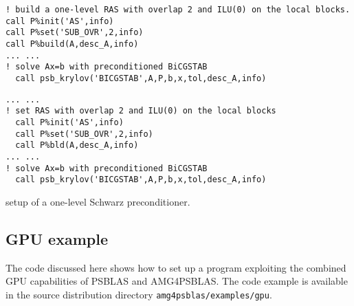 \begin{listing}[h!]
\ifpdf
\begin{verbatim}
! build a one-level RAS with overlap 2 and ILU(0) on the local blocks.
call P%init('AS',info)
call P%set('SUB_OVR',2,info)
call P%build(A,desc_A,info)
... ...
! solve Ax=b with preconditioned BiCGSTAB
  call psb_krylov('BICGSTAB',A,P,b,x,tol,desc_A,info)
\end{verbatim}
\else
\begin{center}
\begin{minipage}{.90\textwidth}
{\small
\begin{verbatim}
... ...
! set RAS with overlap 2 and ILU(0) on the local blocks
  call P%init('AS',info)
  call P%set('SUB_OVR',2,info)
  call P%bld(A,desc_A,info)
... ...
! solve Ax=b with preconditioned BiCGSTAB
  call psb_krylov('BICGSTAB',A,P,b,x,tol,desc_A,info)
\end{verbatim}
}
\end{minipage}
\end{center}
\fi\vspace{-2em}%
\caption{setup of a one-level Schwarz preconditioner.\label{fig:ex4}}
\end{listing}



\subsection{GPU example\label{sec:gpu-example}}

The code discussed here  shows how to set  up a
program exploiting the combined GPU capabilities of PSBLAS and
AMG4PSBLAS. The code example is available in the source distribution
directory \verb|amg4psblas/examples/gpu|. 

